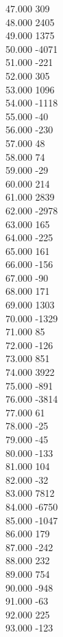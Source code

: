 { 47.000	309 \\
 48.000	2405 \\
 49.000	1375 \\
 50.000	-4071 \\
 51.000	-221 \\
 52.000	305 \\
 53.000	1096 \\
 54.000	-1118 \\
 55.000	-40 \\
 56.000	-230 \\
 57.000	48 \\
 58.000	74 \\
 59.000	-29 \\
 60.000	214 \\
 61.000	2839 \\
 62.000	-2978 \\
 63.000	165 \\
 64.000	-225 \\
 65.000	161 \\
 66.000	-156 \\
 67.000	-90 \\
 68.000	171 \\
 69.000	1303 \\
 70.000	-1329 \\
 71.000	85 \\
 72.000	-126 \\
 73.000	851 \\
 74.000	3922 \\
 75.000	-891 \\
 76.000	-3814 \\
 77.000	61 \\
 78.000	-25 \\
 79.000	-45 \\
 80.000	-133 \\
 81.000	104 \\
 82.000	-32 \\
 83.000	7812 \\
 84.000	-6750 \\
 85.000	-1047 \\
 86.000	179 \\
 87.000	-242 \\
 88.000	232 \\
 89.000	754 \\
 90.000	-948 \\
 91.000	-63 \\
 92.000	225 \\
 93.000	-123 \\
}
